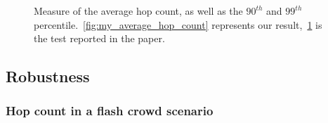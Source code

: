 \documentclass{beamer}
\begin{document}
\begin{frame}
\begin{figure}
\begin{subfigure}{.5\textwidth}
  \caption{}
  \label{fig:paper_average_hop_count}
\end{subfigure}
\caption{Measure of the average hop count, as well as the $90^{th}$ and $99^{th}$ percentile.~\ref{fig:my_average_hop_count} represents our result,~\ref{fig:paper_average_hop_count} is the test reported in the paper.}
\label{fig:freshness}
\end{figure}
\end{frame}

\subsection{Robustness}

\begin{frame}
\frametitle{Hop count in a flash crowd scenario}


\end{frame}
\end{document}
